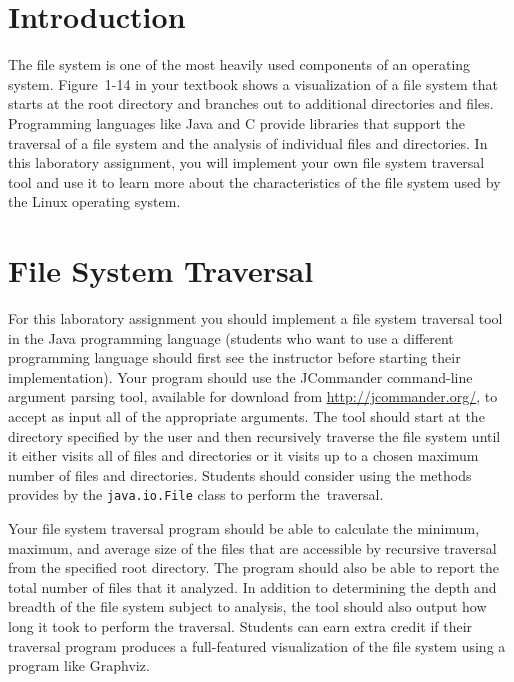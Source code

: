 

\usepackage[compact]{titlesec}



\section*{Introduction}

The file system is one of the most heavily used components of an operating system.  Figure~1-14 in your textbook shows a
visualization of a file system that starts at the root directory and branches out to additional directories and files.
Programming languages like Java and C provide libraries that support the traversal of a file system and the analysis of individual
files and directories. In this laboratory assignment, you will implement your own file system traversal tool and use it to learn
more about the characteristics of the file system used by the Linux operating system.

\section*{File System Traversal}

For this laboratory assignment you should implement a file system traversal tool in the Java programming language (students who
want to use a different programming language should first see the instructor before starting their implementation). Your program
should use the JCommander command-line argument parsing tool, available for download from \url{http://jcommander.org/}, to accept
as input all of the appropriate arguments. The tool should start at the directory specified by the user and then recursively
traverse the file system until it either visits all of files and directories or it visits up to a chosen maximum number of files
and directories. Students should consider using the methods provides by the {\tt java.io.File} class to perform \mbox{the
  traversal}.

Your file system traversal program should be able to calculate the minimum, maximum, and average size of the files that are
accessible by recursive traversal from the specified root directory. The program should also be able to report the total number of
files that it analyzed.  In addition to determining the depth and breadth of the file system subject to analysis, the tool should
also output how long it took to perform the traversal. Students can earn extra credit if their traversal program produces a
full-featured visualization of the file system using a program like Graphviz.

